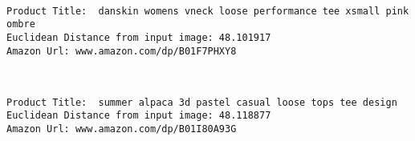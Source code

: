 \documentclass[11pt]{article}
\begin{document}
    \begin{center}
    \end{center}
    { \hspace*{\fill} \\}
    
    \begin{Verbatim}[commandchars=\\\{\}]
Product Title:  danskin womens vneck loose performance tee xsmall pink ombre 
Euclidean Distance from input image: 48.101917
Amazon Url: www.amazon.com/dp/B01F7PHXY8

    \end{Verbatim}

    \begin{center}
    \end{center}
    { \hspace*{\fill} \\}
    
    \begin{Verbatim}[commandchars=\\\{\}]
Product Title:  summer alpaca 3d pastel casual loose tops tee design 
Euclidean Distance from input image: 48.118877
Amazon Url: www.amazon.com/dp/B01I80A93G

    \end{Verbatim}
\end{document}
